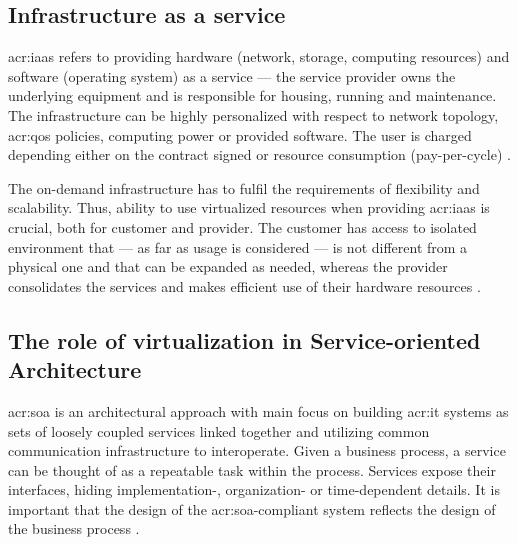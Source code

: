 \documentclass[11pt,openany]{book}
\begin{document}
      \subsection{Infrastructure as a service}

        \gls{acr:iaas} refers to providing hardware (network, storage, computing resources) and software (operating
        system) as a service --- the service provider owns the underlying equipment and is responsible for housing,
        running and maintenance. The infrastructure can be highly personalized with respect to network topology,
        \gls{acr:qos} policies, computing power or provided software. The user is charged depending either on the
        contract signed or resource consumption (pay-per-cycle) \cite{iaas}.

        The on-demand infrastructure has to fulfil the requirements of flexibility and scalability. Thus, ability to use
        virtualized resources when providing \gls{acr:iaas} is crucial, both for customer and provider. The customer has
        access to isolated environment that --- as far as usage is considered --- is not different from a physical one
        and that can be expanded as needed, whereas the provider consolidates the services and makes efficient use of
        their hardware resources \cite{iaas}.




      \subsection{The role of virtualization in Service-oriented Architecture}

        \gls{acr:soa} is an architectural approach with main focus on building \gls{acr:it} systems as sets of loosely
        coupled services linked together and utilizing common communication infrastructure to interoperate. Given a
        business process, a service can be thought of as a repeatable task within the process. Services expose their
        interfaces, hiding implementation-, organization- or time-dependent details. It is important that the design of
        the \gls{acr:soa}-compliant system reflects the design of the business process \cite{soa-foundation}.
\end{document}
